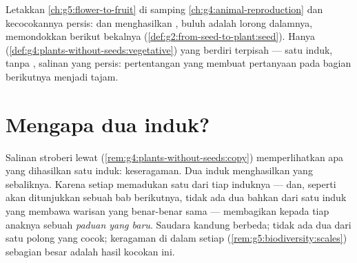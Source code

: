 \begin{remark}\label{rem:g8:sexual-reproduction:plants}
Letakkan \cref{ch:g5:flower-to-fruit} di samping
\cref{ch:g4:animal-reproduction} dan kecocokannya persis: 
dan  menghasilkan , buluh  adalah lorong
 dalamnya,  memondokkan   berikut
bekalnya (\cref{def:g2:from-seed-to-plant:seed}). Hanya
(\cref{def:g4:plants-without-seeds:vegetative}) yang berdiri terpisah
--- satu induk, tanpa , salinan yang persis: pertentangan yang
membuat pertanyaan pada bagian berikutnya menjadi tajam.
\end{remark}

\section{Mengapa dua induk?}

\begin{proposition}\label{prop:g8:sexual-reproduction:shuffle}
Salinan stroberi lewat 
(\cref{rem:g4:plants-without-seeds:copy}) memperlihatkan apa yang
dihasilkan satu induk: keseragaman. Dua induk menghasilkan yang
sebaliknya. Karena setiap  memadukan satu  dari tiap
induknya --- dan, seperti akan ditunjukkan sebuah bab berikutnya,
tidak ada dua  bahkan dari satu induk yang membawa warisan yang
benar-benar sama ---  membagikan kepada tiap anaknya
sebuah \emph{paduan yang baru}. Saudara kandung berbeda; tidak ada dua
 dari satu polong yang cocok; keragaman di dalam setiap 
(\cref{rem:g5:biodiversity:scales}) sebagian besar adalah hasil
kocokan ini.
\end{proposition}
\admitted

